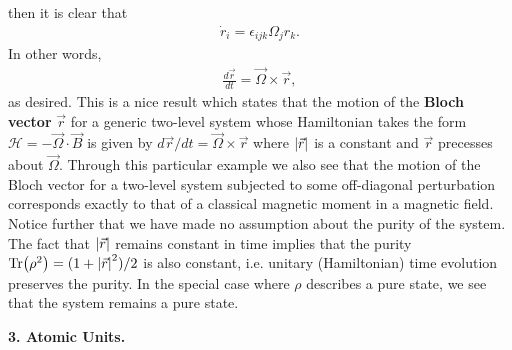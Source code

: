 \documentclass{article}
\theoremstyle{definition}
\newcommand{\ham}{\mathcal{H}}
\newcommand{\f}[2]{\frac{#1}{#2}}
\begin{document}
then it is clear that
\begin{align*}
\dot r_i = \epsilon_{ijk} \Omega_j r_k.
\end{align*}
In other words, 
\begin{align*}
\f{d\vec{r}}{dt} = \vec{\Omega} \times \vec{r},
\end{align*}
as desired. This is a nice result which states that the motion of the \textbf{Bloch vector} $\vec{r}$ for a generic two-level system whose Hamiltonian takes the form $\ham = - \vec{\Omega} \cdot \vec{B}$ is given by $d\vec{r}/dt = \vec{\Omega}\times \vec{r}$ where $\abs{\vec{r}}$ is a constant and $\vec{r}$ precesses about $\vec{\Omega}$. Through this particular example we also see that the motion of the Bloch vector for a two-level system subjected to some off-diagonal perturbation corresponds exactly to that of a classical magnetic moment in a magnetic field. \\


Notice further that we have made no assumption about the purity of the system. The fact that $\abs{\vec{r}}$ remains constant in time implies that the purity $\Tr(\rho^2) = (1 + \abs{\vec{r}}^2)/2$ is also constant, i.e. unitary (Hamiltonian) time evolution preserves the purity. In the special case where $\rho$ describes a pure state, we see  that the system remains a pure state. \\









\newpage



\noindent \textbf{3. Atomic Units.}
\end{document}
